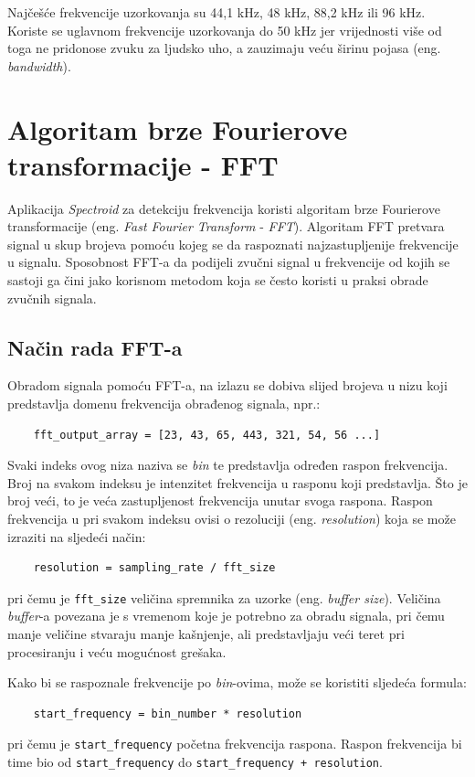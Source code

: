 \documentclass[times, utf8, zavrsni, numeric]{fer}
\begin{document}
Najčešće frekvencije uzorkovanja su 44,1 kHz, 48 kHz, 88,2 kHz ili 96 kHz.\cite{self2012audio} Koriste se uglavnom frekvencije uzorkovanja do 50 kHz jer vrijednosti više od toga ne pridonose zvuku za ljudsko uho, a zauzimaju veću širinu pojasa (eng. \textit{bandwidth}).

\chapter{Algoritam brze Fourierove transformacije - FFT}
Aplikacija \textit{Spectroid} za detekciju frekvencija koristi algoritam brze Fourierove transformacije (eng. \textit{Fast Fourier Transform} - \textit{FFT}). Algoritam FFT pretvara signal u skup brojeva pomoću kojeg se da raspoznati najzastupljenije frekvencije u signalu. Sposobnost FFT-a da podijeli zvučni signal u frekvencije od kojih se sastoji ga čini jako korisnom metodom koja se često koristi u praksi obrade zvučnih signala.\cite{gustine_2021}

\section{Način rada FFT-a}
Obradom signala pomoću FFT-a, na izlazu se dobiva slijed brojeva u nizu koji predstavlja domenu frekvencija obrađenog signala, npr.:
\begin{verbatim}
	fft_output_array = [23, 43, 65, 443, 321, 54, 56 ...]
\end{verbatim}
Svaki indeks ovog niza naziva se \textit{bin} te predstavlja određen raspon frekvencija. Broj na svakom indeksu je intenzitet frekvencija u rasponu koji predstavlja. Što je broj veći, to je veća zastupljenost frekvencija unutar svoga raspona. Raspon frekvencija u pri svakom indeksu ovisi o rezoluciji (eng. \textit{resolution}) koja se može izraziti na sljedeći način:
\begin{verbatim}
	resolution = sampling_rate / fft_size
\end{verbatim}
pri čemu je \verb|fft_size| veličina spremnika za uzorke (eng. \textit{buffer size}).\cite{lourde2009digital} Veličina \textit{buffer}-a povezana je s vremenom koje je potrebno za obradu signala, pri čemu manje veličine stvaraju manje kašnjenje, ali predstavljaju veći teret pri procesiranju i veću mogućnost grešaka.\cite{focusrite_2022}

Kako bi se raspoznale frekvencije po \textit{bin}-ovima, može se koristiti sljedeća formula:
\begin{verbatim}
	start_frequency = bin_number * resolution
\end{verbatim}
pri čemu je \verb|start_frequency| početna frekvencija raspona.\cite{gustine_2021} Raspon frekvencija bi time bio od \verb|start_frequency| do \verb|start_frequency + resolution|.
\end{document}
